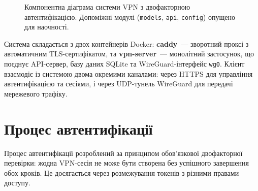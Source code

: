 \begin{figure}[htbp]
\caption{Компонентна діаграма системи VPN з двофакторною автентифікацією. Допоміжні модулі (\texttt{models}, \texttt{api}, \texttt{config}) опущено для наочності.}
\label{fig:component_diagram}
\end{figure}

Система складається з двох контейнерів Docker: \textbf{caddy}~--- зворотний
проксі з автоматичним TLS-сертифікатом, та \textbf{vpn-server}~--- монолітний
застосунок, що поєднує API-сервер, базу даних SQLite та WireGuard-інтерфейс
\texttt{wg0}. Клієнт взаємодіє із системою двома окремими каналами: через
HTTPS для управління автентифікацією та сесіями, і через UDP-тунель WireGuard
для передачі мережевого трафіку.

\section{Процес автентифікації}
\label{sec:auth_flow}

Процес автентифікації розроблений за принципом обов'язкової двофакторної
перевірки: жодна VPN-сесія не може бути створена без успішного завершення
обох кроків. Це досягається через розмежування токенів з різними правами
доступу.

